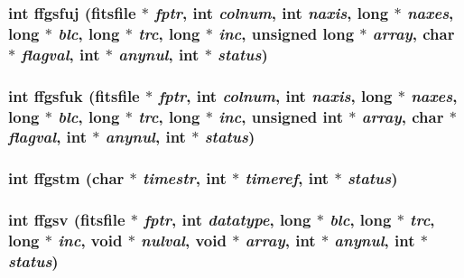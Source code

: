 \subsubsection{\setlength{\rightskip}{0pt plus 5cm}int ffgsfuj (\bf{fitsfile} $\ast$ {\em fptr}, int {\em colnum}, int {\em naxis}, long $\ast$ {\em naxes}, long $\ast$ {\em blc}, long $\ast$ {\em trc}, long $\ast$ {\em inc}, unsigned long $\ast$ {\em array}, char $\ast$ {\em flagval}, int $\ast$ {\em anynul}, int $\ast$ {\em status})}\label{test_2shm__client_2fitsio_8h_60eb38f1f62e5060ffca964466dd248e}


\subsubsection{\setlength{\rightskip}{0pt plus 5cm}int ffgsfuk (\bf{fitsfile} $\ast$ {\em fptr}, int {\em colnum}, int {\em naxis}, long $\ast$ {\em naxes}, long $\ast$ {\em blc}, long $\ast$ {\em trc}, long $\ast$ {\em inc}, unsigned int $\ast$ {\em array}, char $\ast$ {\em flagval}, int $\ast$ {\em anynul}, int $\ast$ {\em status})}\label{test_2shm__client_2fitsio_8h_8c55ce0c3ac249a3b00043f7872099f4}


\subsubsection{\setlength{\rightskip}{0pt plus 5cm}int ffgstm (char $\ast$ {\em timestr}, int $\ast$ {\em timeref}, int $\ast$ {\em status})}\label{test_2shm__client_2fitsio_8h_261640d215b78ccc9368b45915b4b199}


\subsubsection{\setlength{\rightskip}{0pt plus 5cm}int ffgsv (\bf{fitsfile} $\ast$ {\em fptr}, int {\em datatype}, long $\ast$ {\em blc}, long $\ast$ {\em trc}, long $\ast$ {\em inc}, void $\ast$ {\em nulval}, void $\ast$ {\em array}, int $\ast$ {\em anynul}, int $\ast$ {\em status})}\label{test_2shm__client_2fitsio_8h_caeaf7b359e9abbf70e7e912e14329fa}


